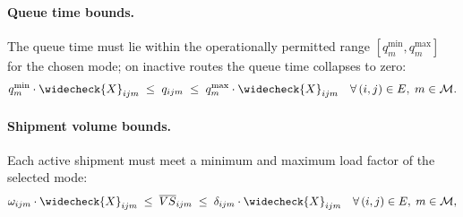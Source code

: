 
\paragraph{Queue time bounds.}
The queue time must lie within the operationally permitted range
$[q^{\min}_{m},q^{\max}_{m}]$ for the chosen mode; on inactive
routes the queue time collapses to zero:
%
\begin{align}
  q^{\min}_{m}\cdot\widecheck{X}_{ijm}
  \;\leq\; q_{ijm}
  \;\leq\; q^{\max}_{m}\cdot\widecheck{X}_{ijm}
  && \forall\,(i,j)\in E,\;m\in\mathcal{M}.
  \label{eq:q-bounds}
\end{align}


\paragraph{Shipment volume bounds.}
Each active shipment must meet a minimum and maximum load factor of the selected mode:
%
\begin{align}
  \omega_{ijm}\cdot\widecheck{X}_{ijm}
  \;\leq\; \overline{VS}_{ijm}
  \;\leq\; \delta_{ijm}\cdot\widecheck{X}_{ijm}
  && \forall\,(i,j)\in E,\;m\in\mathcal{M},
  \label{eq:vol-bounds}
\end{align}


